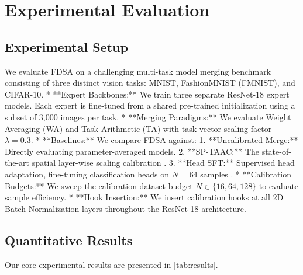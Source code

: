 \documentclass{article}
\begin{document}
\section{Experimental Evaluation}
\label{sec:experiments}

\subsection{Experimental Setup}
We evaluate FDSA on a challenging multi-task model merging benchmark consisting of three distinct vision tasks: MNIST, FashionMNIST (FMNIST), and CIFAR-10.
*   **Expert Backbones:** We train three separate ResNet-18 expert models. Each expert is fine-tuned from a shared pre-trained initialization using a subset of 3,000 images per task.
*   **Merging Paradigms:** We evaluate Weight Averaging (WA) and Task Arithmetic (TA) with task vector scaling factor $\lambda = 0.3$.
*   **Baselines:** We compare FDSA against:
    1.  **Uncalibrated Merge:** Directly evaluating parameter-averaged models.
    2.  **SP-TAAC:** The state-of-the-art spatial layer-wise scaling calibration \citep{submission8}.
    3.  **Head SFT:** Supervised head adaptation, fine-tuning classification heads on $N=64$ samples \citep{submission7}.
*   **Calibration Budgets:** We sweep the calibration dataset budget $N \in \{16, 64, 128\}$ to evaluate sample efficiency.
*   **Hook Insertion:** We insert calibration hooks at all 2D Batch-Normalization layers throughout the ResNet-18 architecture.

\subsection{Quantitative Results}
Our core experimental results are presented in \cref{tab:results}.
\end{document}
